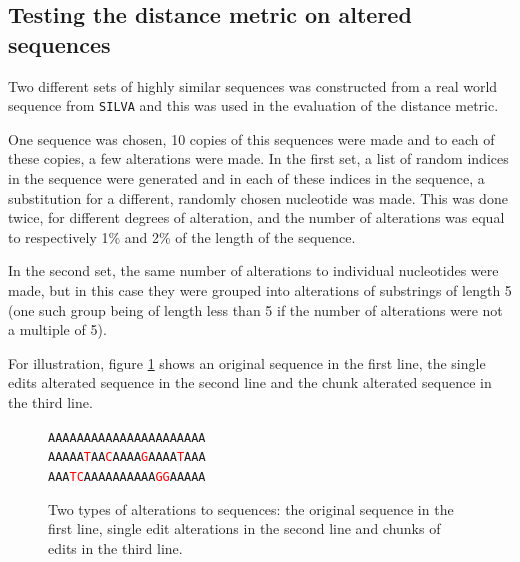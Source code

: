 

\subsection{Testing the distance metric on altered sequences}
\label{sec:altered_sequences}

%

Two different sets of highly similar sequences was constructed from a real
world sequence from \texttt{SILVA} and this was used in the evaluation of the
distance metric.

One sequence was chosen, 10 copies of this sequences were made and to each of
these copies, a few alterations were made. In the first set, a list of random
indices in the sequence were generated and in each of these indices in the
sequence, a substitution for a different, randomly chosen nucleotide was made.
This was done twice, for different degrees of alteration, and the number of
alterations was equal to respectively 1\% and 2\% of the length of the
sequence.

In the second set, the same number of alterations to individual nucleotides
were made, but in this case they were grouped into alterations of substrings of
length 5 (one such group being of length less than 5 if the number of
alterations were not a multiple of 5).

For illustration, figure \ref{fig:alterations} shows an original sequence in
the first line, the single edits alterated sequence in the second line and the
chunk alterated sequence in the third line.

\newcommand{\tc}[1]{\textcolor{red}{#1}}
\begin{figure}[H]
  \centering
  \texttt{AAAAAAAAAAAAAAAAAAAAAA} \\
  \texttt{AAAAA\tc{T}AA\tc{C}AAAA\tc{G}AAAA\tc{T}AAA} \\
  \texttt{AAA\tc{TC}AAAAAAAAAA\tc{GG}AAAAA}
  \caption{Two types of alterations to sequences: the original sequence in the
    first line, single edit alterations in the second line and chunks of edits
    in the third line.}
  \label{fig:alterations}
\end{figure}


